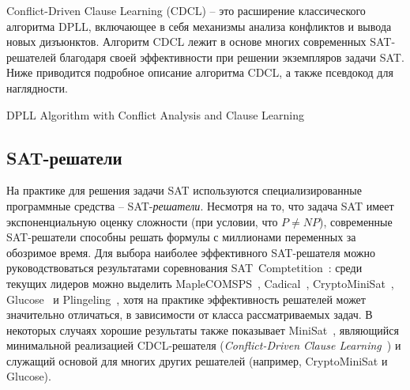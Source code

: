 Conflict-Driven Clause Learning (CDCL) \--- это расширение классического алгоритма DPLL, включающее в себя механизмы анализа конфликтов и вывода новых дизъюнктов.
Алгоритм CDCL лежит в основе многих современных SAT-решателей благодаря своей эффективности при решении экземпляров задачи SAT.
Ниже приводится подробное описание алгоритма CDCL, а также псевдокод для наглядности.


\begin{algorithm}[H]
    \caption{DPLL Algorithm with Conflict Analysis and Clause Learning}
    \DontPrintSemicolon


\end{algorithm}

\subsection{SAT-решатели}
\label{sub:sat-solvers}

На практике для решения задачи SAT используются специализированные программные средства \--- SAT-\emph{решатели}.
Несмотря на то, что задача SAT имеет экспоненциальную оценку сложности (при условии, что $P \neq NP$), современные SAT-решатели способны решать формулы с миллионами переменных за обозримое время.
Для выбора наиболее эффективного SAT-решателя можно руководствоваться результатами соревнования SAT~Comptetition~\cite{sat-competition}: среди текущих лидеров можно выделить MapleCOMSPS~\cite{liang-2016}, Cadical~\cite{cadical}, CryptoMiniSat~\cite{cryptominisat}, Glucose~\cite{glucose} и Plingeling~\cite{lingeling-and-friends}, хотя на практике эффективность решателей может значительно отличаться, в зависимости от класса рассматриваемых задач.
В некоторых случаях хорошие результаты также показывает MiniSat~\cite{minisat}, являющийся минимальной реализацией CDCL-решателя (\textit{Conflict-Driven Clause Learning}~\cite{grasp}) и служащий основой для многих других решателей (например, CryptoMiniSat и Glucose).

